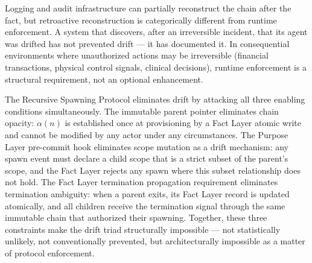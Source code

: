 Logging and audit infrastructure can partially reconstruct the chain after the fact, but retroactive reconstruction is categorically different from runtime enforcement.  A system that discovers, after an irreversible incident, that its agent was drifted has not prevented drift — it has documented it.  In consequential environments where unauthorized actions may be irreversible (financial transactions, physical control signals, clinical decisions), runtime enforcement is a structural requirement, not an optional enhancement.

The Recursive Spawning Protocol eliminates drift by attacking all three enabling conditions simultaneously.  The immutable parent pointer eliminates chain opacity: $\alpha(n)$ is established once at provisioning by a Fact Layer atomic write and cannot be modified by any actor under any circumstances.  The Purpose Layer pre-commit hook eliminates scope mutation as a drift mechanism: any spawn event must declare a child scope that is a strict subset of the parent's scope, and the Fact Layer rejects any spawn where this subset relationship does not hold.  The Fact Layer termination propagation requirement eliminates termination ambiguity: when a parent exits, its Fact Layer record is updated atomically, and all children receive the termination signal through the same immutable chain that authorized their spawning.  Together, these three constraints make the drift triad structurally impossible — not statistically unlikely, not conventionally prevented, but architecturally impossible as a matter of protocol enforcement.
